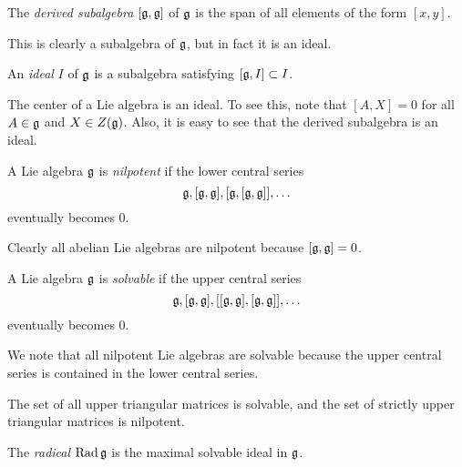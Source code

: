 \documentclass[twoside, 10pt]{article}
\begin{document}
    \begin{defn}
        The \textit{derived subalgebra} $[\mathfrak{g},\mathfrak{g}]$ of $\mathfrak{g}$ is the span of all elements of the form $[x,y]$.
    \end{defn}

    This is clearly a subalgebra of $\mathfrak{g}$, but in fact it is an ideal.

    \begin{defn}
        An \textit{ideal} $I$ of $\mathfrak{g}$ is a subalgebra satisfying $[\mathfrak{g},I] \subset I$.
    \end{defn}

    \begin{exm}
        The center of a Lie algebra is an ideal. To see this, note that $[A,X] = 0$ for all $A \in \mathfrak{g}$ and $X \in Z(\mathfrak{g})$. Also, it is easy to see that the derived subalgebra is an ideal.
    \end{exm}

    \begin{defn}
        A Lie algebra $\mathfrak{g}$ is \textit{nilpotent} if the lower central series \[\mathfrak{g}, [\mathfrak{g}, \mathfrak{g}], [\mathfrak{g}, [\mathfrak{g}, \mathfrak{g}]], \ldots \] eventually becomes $0$.
    \end{defn}

    \begin{exm}
        Clearly all abelian Lie algebras are nilpotent because $[\mathfrak{g}, \mathfrak{g}] = 0$.
    \end{exm}

    \begin{defn}
        A Lie algebra $\mathfrak{g}$ is \textit{solvable} if the upper central series
        \[\mathfrak{g}, [\mathfrak{g}, \mathfrak{g}], [[\mathfrak{g}, \mathfrak{g}], [\mathfrak{g}, \mathfrak{g}]], \ldots \] eventually becomes $0$.
    \end{defn}

    \begin{exm}
        We note that all nilpotent Lie algebras are solvable because the upper central series is contained in the lower central series.
    \end{exm}

    \begin{exm}
        The set of all upper triangular matrices is solvable, and the set of strictly upper triangular matrices is nilpotent.
    \end{exm}

    \begin{defn}
        The \textit{radical} $\operatorname{Rad} \mathfrak{g}$ is the maximal solvable ideal in $\mathfrak{g}$.
    \end{defn}
\end{document}
